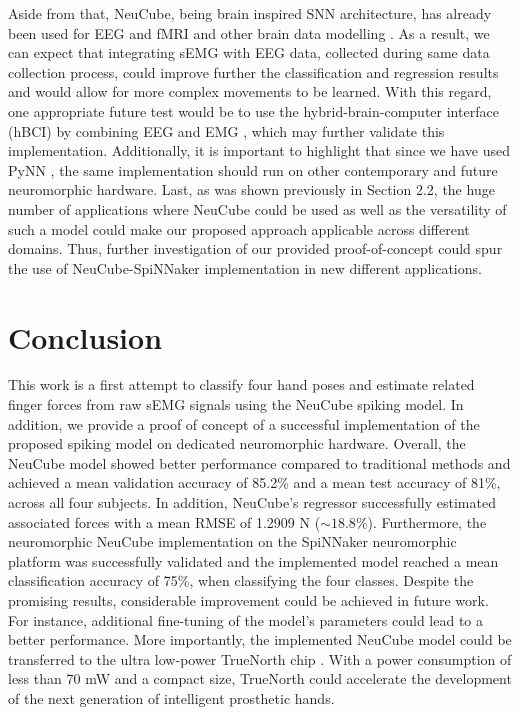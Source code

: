 \documentclass[journal,article,submit,moreauthors,pdftex,10pt,a4paper]{Definitions/mdpi}
\begin{document}
Aside from that, NeuCube, being brain inspired SNN architecture, has already been used for EEG and fMRI and other brain data modelling \cite{51}. As a result, we can expect that integrating sEMG with EEG data, collected during same data collection process, could improve further the classification and regression results and would allow for more complex movements to be learned. With this regard, one appropriate future test would be to use the hybrid-brain-computer interface (hBCI) by combining EEG and EMG \cite{52}, which may further validate this implementation. Additionally, it is important to highlight that since we have used PyNN \cite{42}, the same implementation should run on other contemporary and future neuromorphic hardware. 
Last, as was shown previously in Section 2.2, the huge number of applications where NeuCube could be used as well as the versatility of such a model could make our proposed approach applicable across different domains. Thus, further investigation of our provided proof-of-concept could spur the use of NeuCube-SpiNNaker implementation in new different applications. 

\section{Conclusion}
This work is a first attempt to classify four hand poses and estimate related finger forces from raw sEMG signals using the NeuCube spiking model. In addition, we provide a proof of concept of a successful implementation of the proposed spiking model on dedicated neuromorphic hardware. Overall, the NeuCube model showed better performance compared to traditional methods and achieved a mean validation accuracy of 85.2\% and a mean test accuracy of 81\%, across all four subjects. In addition, NeuCube's regressor successfully estimated associated forces with a mean RMSE of 1.2909 N ($\sim 18.8\%$). Furthermore, the neuromorphic NeuCube implementation on the SpiNNaker neuromorphic platform was successfully validated and the implemented model reached a mean classification accuracy of 75\%, when classifying the four classes. Despite the promising results, considerable improvement could be achieved in future work. For instance, additional fine-tuning of the model's parameters  could lead to a better performance. More importantly, the implemented NeuCube model could be transferred to the ultra low-power TrueNorth chip \cite{53}. With a power consumption of less than 70 mW and a compact size, TrueNorth could accelerate the development of the next generation of intelligent prosthetic hands. 
\end{document}
